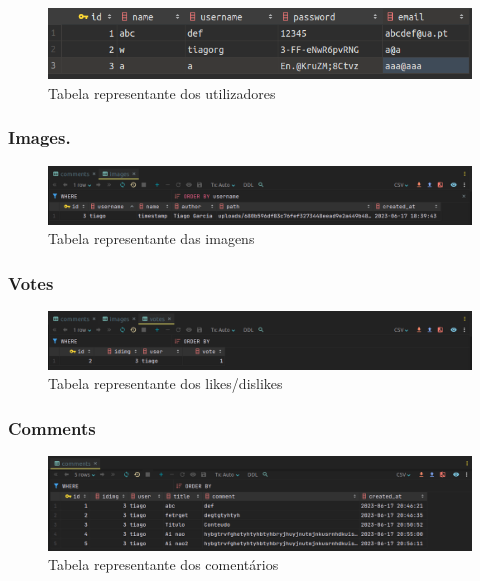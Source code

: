 \documentclass{report}
\begin{document}
\begin{figure}[H]
    \centering
    \includegraphics[scale=0.2]{../images/users}
    \caption{Tabela representante dos utilizadores}
    \label{fig:users}
\end{figure}

\subsubsection{Images.}

\begin{figure}[H]
    \centering
    \includegraphics[scale=0.2]{../images/images}
    \caption{Tabela representante das imagens}
    \label{fig:images}
\end{figure}

\subsubsection{Votes}

\begin{figure}[H]
    \centering
    \includegraphics[scale=0.2]{../images/votes}
    \caption{Tabela representante dos likes/dislikes}
    \label{fig:votes}
\end{figure}

\subsubsection{Comments}

\begin{figure}[H]
    \centering
    \includegraphics[scale=0.2]{../images/comments}
    \caption{Tabela representante dos comentários}
    \label{fig:comments}
\end{figure}
\end{document}
